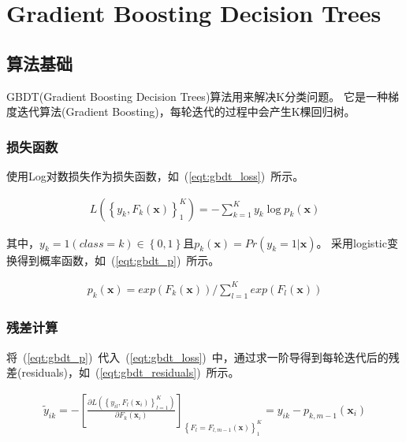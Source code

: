 \documentclass[a4paper,11pt,         %
               ]{article}
\begin{document}
\section{Gradient Boosting Decision Trees}

\subsection{算法基础}

GBDT(Gradient Boosting Decision Trees)算法用来解决K分类问题。 它是一种梯度迭代算法(Gradient Boosting)，每轮迭代的过程中会产生K棵回归树。

\subsubsection{损失函数}

使用Log对数损失作为损失函数，如~(\ref{eqt:gbdt_loss})~所示。

\begin{eqnarray}
  \label{eqt:gbdt_loss}
L\left ( \left \{ y_{k}, F_{k}\left ( \mathbf{x} \right ) \right \}_{1}^{K} \right ) = -\sum _{k=1}^{K} {y_{k} \log p_{k}(\mathbf{x})}
\end{eqnarray}

其中，$y_{k}=1(class=k)\in \left \{ 0, 1 \right \}$且$p_{k}\left ( \mathbf{x} \right ) = Pr(y_{k}=1| \mathbf{x})$。 采用logistic变换得到概率函数，如~(\ref{eqt:gbdt_p})~所示。

\begin{eqnarray}
  \label{eqt:gbdt_p}
p_{k}\left ( \mathbf{x} \right ) = exp\left ( F_{k}\left ( \mathbf{x} \right ) \right ) / \sum _{l=1}^{K}{exp\left ( F_{l}\left ( \mathbf{x} \right ) \right )}
\end{eqnarray}

\subsubsection{残差计算}

将~(\ref{eqt:gbdt_p})~代入~(\ref{eqt:gbdt_loss})~中，通过求一阶导得到每轮迭代后的残差(residuals)，如~(\ref{eqt:gbdt_residuals})~所示。

\begin{eqnarray}
  \label{eqt:gbdt_residuals}
\tilde{y}_{ik}=-\left [ \frac{\partial L\left ( \left \{ y_{il},F_{l}\left ( \mathbf{x}_{i} \right ) \right \}_{l=1}^{K} \right )}{\partial F_{k}\left ( \mathbf{x}_{i} \right )} \right ]_{\left \{ F_{l}=F_{l,m-1}\left ( \mathbf{x} \right ) \right \}_{1}^{K}} = y_{ik}-p_{k,m-1}\left ( \mathbf{x}_{i} \right )
\end{eqnarray}
\end{document}
